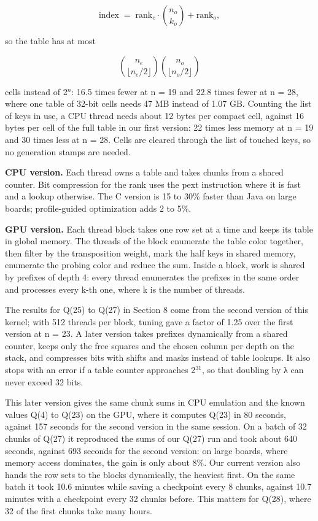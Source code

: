 \[\mathrm{index} \;=\; \mathrm{rank}_e \cdot \binom{n_o}{k_o} + \mathrm{rank}_o,\]

so the table has at most

\[\binom{n_e}{\lfloor n_e/2 \rfloor} \binom{n_o}{\lfloor n_o/2 \rfloor}\]

cells instead of 2$^{n}$: 16.5 times fewer at n = 19 and 22.8 times fewer at n = 28, where one table of 32-bit cells needs 47 MB instead of 1.07 GB. Counting the list of keys in use, a CPU thread needs about 12 bytes per compact cell, against 16 bytes per cell of the full table in our first version: 22 times less memory at n = 19 and 30 times less at n = 28. Cells are cleared through the list of touched keys, so no generation stamps are needed.

\textbf{CPU version.} Each thread owns a table and takes chunks from a shared counter. Bit compression for the rank uses the pext instruction where it is fast and a lookup otherwise. The C version is 15 to 30\% faster than Java on large boards; profile-guided optimization adds 2 to 5\%.

\textbf{GPU version.} Each thread block takes one row set at a time and keeps its table in global memory. The threads of the block enumerate the table color together, then filter by the transposition weight, mark the half keys in shared memory, enumerate the probing color and reduce the sum. Inside a block, work is shared by prefixes of depth 4: every thread enumerates the prefixes in the same order and processes every k-th one, where k is the number of threads.

The results for Q(25) to Q(27) in Section 8 come from the second version of this kernel; with 512 threads per block, tuning gave a factor of 1.25 over the first version at n = 23. A later version takes prefixes dynamically from a shared counter, keeps only the free squares and the chosen column per depth on the stack, and compresses bits with shifts and masks instead of table lookups. It also stops with an error if a table counter approaches 2$^{31}$, so that doubling by λ can never exceed 32 bits.

This later version gives the same chunk sums in CPU emulation and the known values Q(4) to Q(23) on the GPU, where it computes Q(23) in 80 seconds, against 157 seconds for the second version in the same session. On a batch of 32 chunks of Q(27) it reproduced the sums of our Q(27) run and took about 640 seconds, against 693 seconds for the second version: on large boards, where memory access dominates, the gain is only about 8\%. Our current version also hands the row sets to the blocks dynamically, the heaviest first. On the same batch it took 10.6 minutes while saving a checkpoint every 8 chunks, against 10.7 minutes with a checkpoint every 32 chunks before. This matters for Q(28), where 32 of the first chunks take many hours.

